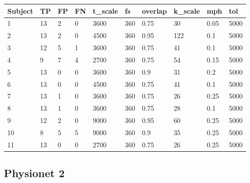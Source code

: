 \begin{table*}[!ht]
    \centering
	\begin{adjustbox}{width=\textwidth}
    \begin{tabular}{l|lllllllll}
    \toprule[0.5mm]
        Subject & TP & FP & FN & t\_scale & fs & overlap & k\_scale & mph & tol\\
        \midrule[0.3mm]
        1&13 & 2 & 0 & 3600 & 360 & 0.75 & 30 & 0.05 & 5000 \\ 
        2&13 & 2 & 0 & 4500 & 360 & 0.95 & 122 & 0.1 & 5000 \\ 
        3&12 & 5 & 1 & 3600 & 360 & 0.75 & 41 & 0.1 & 5000 \\ 
        4&9 & 7 & 4 & 2700 & 360 & 0.75 & 54 & 0.15 & 5000 \\ 
        5&13 & 0 & 0 & 3600 & 360 & 0.9 & 31 & 0.2 & 5000 \\ 
        6&13 & 0 & 0 & 4500 & 360 & 0.75 & 41 & 0.1 & 5000 \\ 
        7&13 & 1 & 0 & 3600 & 360 & 0.75 & 26 & 0.25 & 5000 \\ 
        8&13 & 1 & 0 & 3600 & 360 & 0.75 & 28 & 0.1 & 5000 \\ 
        9&12 & 2 & 0 & 9000 & 360 & 0.95 & 60 & 0.25 & 5000 \\ 
        10&8 & 5 & 5 & 9000 & 360 & 0.9 & 35 & 0.25 & 5000 \\ 
        11&13 & 0 & 0 & 2700 & 360 & 0.75 & 26 & 0.25 & 5000\\
        \bottomrule[0.5mm]
    \end{tabular}
    \end{adjustbox}
\end{table*}

\subsection{Physionet 2}

